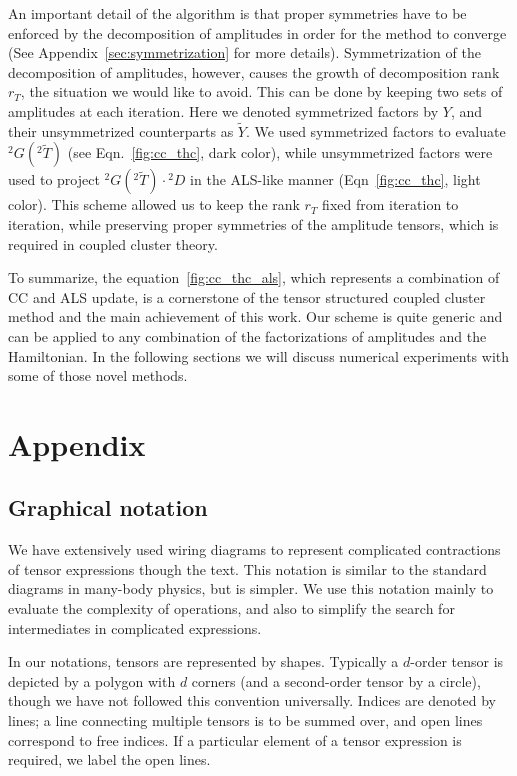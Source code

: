 An important detail of the algorithm is that proper symmetries have to be 
enforced by the decomposition of amplitudes in order for 
the method to converge (See Appendix~\ref{sec:symmetrization} for more 
details). Symmetrization of the decomposition of amplitudes, however, causes 
the growth of decomposition rank $r_{T}$, the situation we would like 
to avoid. This can be done by keeping two sets of amplitudes at each 
iteration. Here we denoted symmetrized factors by $Y$, and their 
unsymmetrized counterparts as $\tilde{Y}$. We used symmetrized factors to 
evaluate ${}^2G({}^2 \tilde{T})$ (see Eqn.~\ref{fig:cc_thc}, dark color), while 
unsymmetrized factors were used to project ${}^2G({}^2 \tilde{T}) 
\cdot {}^2D$ in the ALS-like manner (Eqn~\ref{fig:cc_thc}, light color).
This scheme allowed us to keep the rank $r_{T}$ fixed from iteration to 
iteration, while preserving proper symmetries of the amplitude tensors, which 
is required in coupled cluster theory. 

To summarize, the equation~\ref{fig:cc_thc_als}, which represents a combination 
of CC and ALS update, is a cornerstone of the tensor structured coupled cluster 
method and the main achievement of this work. Our scheme is quite generic  
and can be applied to any combination of the factorizations of amplitudes and 
the Hamiltonian. In the following sections we will discuss numerical experiments 
with some of those novel methods.


\section{Appendix
\label{sec:Appendix}}
\subsection{Graphical notation
\label{sec:graphical_notation}}
We have extensively used wiring diagrams to represent complicated contractions 
of tensor expressions though the text. This notation is similar to the standard 
diagrams in many-body physics,\cite{mattuck2012guide} but is simpler. We use 
this notation mainly to evaluate the complexity of operations, and also to 
simplify the search for intermediates in complicated expressions.  

In our notations, tensors are represented by shapes.  Typically a
$d$-order tensor is depicted by a polygon with $d$ corners (and a
second-order tensor by a circle), though we have not followed this
convention universally. Indices are denoted by lines; a line
connecting multiple tensors is to be summed over, and open lines
correspond to free indices. If a particular element of a tensor
expression is required, we label the open lines.

